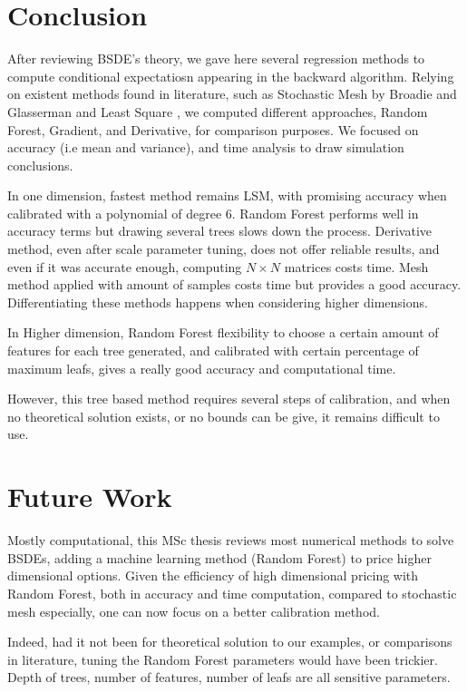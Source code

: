 \documentclass[english,11pt,openany]{report}
\theoremstyle{definition}
\theoremstyle{plain}
\theoremstyle{definition}
\begin{document}
\newpage 


\chapter{Conclusion}

After reviewing BSDE's theory, we gave here several regression methods to compute conditional expectatiosn appearing in the backward algorithm. 
Relying on existent methods found in literature, such as Stochastic Mesh by Broadie and Glasserman \cite{glasserman:broadie} and Least Square \cite{bender:lsmbsde}, we computed different approaches, Random Forest, Gradient, and Derivative, for comparison purposes.
We focused on accuracy (i.e mean and variance), and time analysis to draw simulation conclusions. 


In one dimension, fastest method remains LSM, with promising accuracy when calibrated with a polynomial of degree 6. Random Forest performs well in accuracy terms but drawing several trees slows down the process. Derivative method, even after scale parameter tuning, does not offer reliable results, and even if it was accurate enough, computing $N\times N$ matrices costs time. Mesh method applied with amount of samples costs time but provides a good accuracy. 
Differentiating these methods happens when considering higher dimensions. 


In Higher dimension, Random Forest flexibility to choose a certain amount of features for each tree generated, and calibrated with certain percentage of maximum leafs, gives a really good accuracy and computational time. 

However, this tree based method requires several steps of calibration, and when no theoretical solution exists, or no bounds can be give, it remains difficult to use.



\chapter{Future Work}

Mostly computational, this MSc thesis reviews most numerical methods to solve BSDEs, adding a machine learning method (Random Forest) to price higher dimensional options. 
Given the efficiency of high dimensional pricing with Random Forest, both in accuracy and time computation, compared to stochastic mesh especially, one can now focus on a better calibration method. 

Indeed, had it not been for theoretical solution to our examples, or comparisons in literature, tuning the Random Forest parameters would have been trickier. Depth of trees, number of features, number of leafs are all sensitive parameters. 
\end{document}
